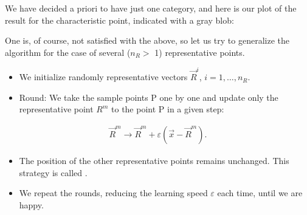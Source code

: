 \documentclass[letterpaper,10pt,english]{jupyterBook}
\begin{document}
\begin{sphinxVerbatim}[commandchars=\\\{\}]
\PYG{p}{[}\PYG{p}{[}\PYG{p}{]}\PYG{p}{[}\PYG{p}{]}\PYG{p}{]}
\end{sphinxVerbatim}

\begin{sphinxVerbatim}[commandchars=\\\{\}]
[0.615 0.489]
\end{sphinxVerbatim}

\sphinxAtStartPar
We have decided a priori to have just one category, and here is our plot of the result for the characteristic point, indicated with a gray blob:

\noindent{}

\sphinxAtStartPar
One is, of course, not satisfied with the above, so let us try to generalize the algorithm for the case of several (\( n_R> \) 1) representative points.
\begin{itemize}
\item {} 
\sphinxAtStartPar
We initialize randomly representative vectors \( \vec{R}^i \), \(i = 1, \dots, n_R \).

\item {} 
\sphinxAtStartPar
Round: We take the sample points P one by one and update only the  representative point \(R^m\) to the point P in a given step:

\end{itemize}
\begin{equation*}
\begin{split} \vec{R}^m \to \vec{R}^m + \varepsilon (\vec{x} - \vec{R}^m). \end{split}
\end{equation*}\begin{itemize}
\item {} 
\sphinxAtStartPar
The position of the other representative points remains unchanged. This strategy is called .

\item {} 
\sphinxAtStartPar
We repeat the rounds, reducing the learning speed \( \varepsilon \) each time, until we are happy.

\end{itemize}
\end{document}
